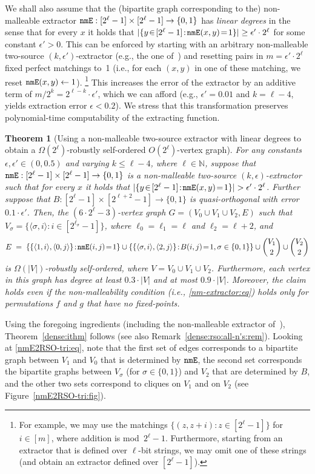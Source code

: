 \documentclass[10pt,a4paper]{article}
\newtheorem{theorem}{Theorem}[section]
\theoremstyle{definition}
\newcommand{\N}{\mathbb N}
\newcommand{\e}{\epsilon}
\newcommand{\bitset}{\{0,1\}}
\newcommand{\ang}[1]{{\langle{#1}\rangle}}
\newcommand{\BT}{\begin{theorem}}   \newcommand{\ET}{\end{theorem}}
\newcommand{\nmE}{{\tt nmE}}
\begin{document}
We shall also assume that the (bipartite graph corresponding to the)
non-malleable extractor ${\nmE}:[2^\ell-1]\times[2^\ell-1]\to\bitset$
has {\em linear degrees}\/ in the sense that for every $x$ it holds that
$|\{y\!\in\![2^\ell-1]\!:\!\nmE(x,y)\!=\!1\}|\geq\e'\cdot2^\ell$
for some constant $\e'>0$.
This can be enforced by starting with an arbitrary
non-malleable two-source $(k,\e')$-extractor
(e.g., the one of~\cite[Thm.~1]{CGL})
and resetting pairs in $m=\e'\cdot2^\ell$ fixed perfect matchings to~1
(i.e., for each $(x,y)$ in one of these matching, we reset $\nmE(x,y)\gets1$).
\footnote{For example, we may use the matchings $\{(z,z+i):z\in[2^\ell-1]\}$
for $i\in[m]$, where addition is mod~$2^\ell-1$.
Furthermore, starting from an extractor that is defined
over $\ell$-bit strings, we may omit one of these strings
(and obtain an extractor defined over $[2^\ell-1]$).}
%
%
%
%
This increases the error of the extractor by an additive
term of $m/2^k=2^{\ell-k}\cdot\e'$, which we can afford
(e.g., $\e'=0.01$ and $k=\ell-4$,
yields extraction error $\e<0.2$).
We stress that this transformation preserves
polynomial-time computability of the extracting function.
%
%
%
%
%
%
%
%
%
%
%
%
%
%
%
%
%
%
%
%
%
%
%

\BT[Using a non-malleable two-source extractor with linear degrees to
obtain a $\Omega(2^\ell)$-robustly self-ordered $O(2^\ell)$-vertex graph]
%
%
%
%
%
%
%
\label{nmE2RSO-tri:thm}
%
%
%
%
%
%
For any constants $\e,\e'\in(0,0.5)$ and varying $k\leq\ell-4$,
where $\ell\in\N$,
suppose that ${\nmE}:[2^\ell-1]\times[2^\ell-1]\to\bitset$
is a non-malleable two-source $(k,\e)$-extractor
such that for every $x$ it holds that
$|\{y\!\in\![2^\ell-1]\!:\!\nmE(x,y)\!=\!1\}|>\e'\cdot2^\ell$.
%
Further suppose that $B:[2^\ell-1]\times[2^{\ell+2}-1]\to\bitset$
is quasi-orthogonal with error $0.1\cdot\e'$.
Then, the $(6\cdot2^{\ell}-3)$-vertex graph $G=(V_0\cup V_1\cup V_2,E)$
such that $V_\sigma=\{\ang{\sigma,i}\!:\!i\!\in\![2^{\ell_\sigma}-1]\}$,
where $\ell_0=\ell_1=\ell$ and $\ell_2=\ell+2$,
and
\begin{equation}\label{nmE2RSO-tri:eq}
E\;=\;\left\{\{\ang{1,i},\ang{0,j}\}\!:\!\nmE(i,j)\!=\!1\right\}
\cup\left\{\{
    \ang{\sigma,i},\ang{2,j}\}\!:\!B(i,j)\!=\!1,\sigma\in\bitset
       \right\}
\cup \binom{V_1}{2}
\cup \binom{V_2}{2}
\end{equation}
%
%
is $\Omega(|V|)$-robustly self-ordered, where $V=V_0\cup V_1\cup V_2$.
%
%
%
%
%
%
%
%
%
%
%
Furthermore, each vertex in this graph has degree
at least $0.3\cdot|V|$ and at most $0.9\cdot|V|$.
Moreover, the claim holds even if
the non-malleability condition {\rm(i.e., \eqref{nm-extractor:eq})}
holds only for permutations $f$ and $g$ that have no fixed-points.
\ET
Using the foregoing ingredients
(including the non-malleable extractor of~\cite[Thm.~1]{CGL}),
Theorem~\ref{dense:ithm} follows
(see also Remark~\ref{dense:rso:all-n's:rem}).
%
Looking at \eqref{nmE2RSO-tri:eq}, note that
the first set of edges corresponds to a bipartite
graph between $V_1$ and $V_0$ that is determined by $\nmE$,
the second set corresponds the bipartite graphs
between $V_\sigma$ (for $\sigma\in\bitset$) and $V_2$
that are determined by $B$,
and the other two sets correspond to cliques on $V_1$ and on $V_2$
(see Figure~\ref{nmE2RSO-tri:fig}).
\medskip
\end{document}
